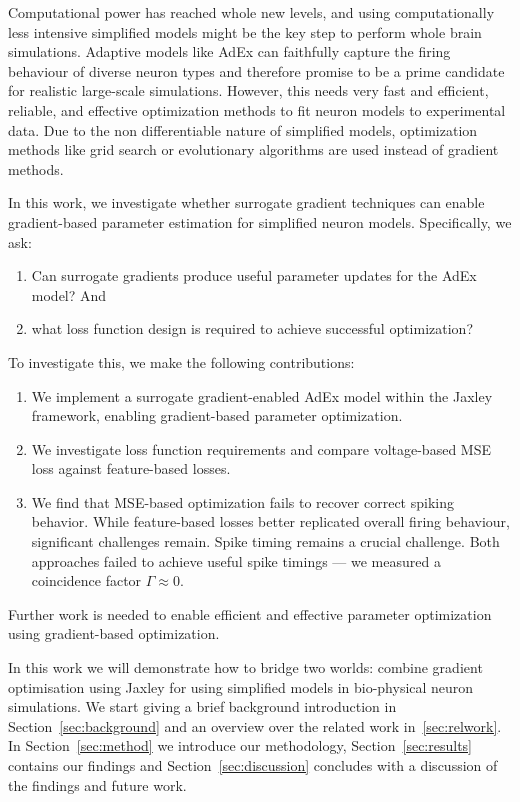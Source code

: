 \documentclass[conference]{IEEEtran}
\begin{document}
Computational power has reached whole new levels, and using computationally less intensive simplified models might be the key step to perform whole brain simulations.
Adaptive models like \ac{AdEx} can faithfully capture the firing behaviour of diverse neuron types and therefore promise to be a prime candidate for realistic large-scale simulations.
However, this needs very fast and efficient, reliable, and effective optimization methods to fit neuron models to experimental data.
Due to the non differentiable nature of simplified models, optimization methods like grid search or evolutionary algorithms are used instead of gradient methods.

In this work, we investigate whether surrogate gradient techniques can enable gradient-based parameter estimation for simplified neuron models.
Specifically, we ask:
\begin{enumerate}
  \item Can surrogate gradients produce useful parameter updates for the \ac{AdEx} model? And
  \item what loss function design is required to achieve successful optimization? 
\end{enumerate}
To investigate this, we make the following contributions:
\begin{enumerate}
  \item We implement a surrogate gradient-enabled \ac{AdEx} model within the Jaxley framework, enabling gradient-based parameter optimization.
  \item We investigate loss function requirements and compare voltage-based \ac{MSE} loss against feature-based losses.
  \item We find that \ac{MSE}-based optimization fails to recover correct spiking behavior.
    While feature-based losses better replicated overall firing behaviour, significant challenges remain.
    Spike timing remains a crucial challenge.
    Both approaches failed to achieve useful spike timings --- we measured a coincidence factor $\Gamma \approx 0$.
\end{enumerate}
Further work is needed to enable efficient and effective parameter optimization using gradient-based optimization.

In this work we will demonstrate how to bridge two worlds: combine gradient optimisation using Jaxley for using simplified models in bio-physical neuron simulations.
We start giving a brief background introduction in Section~\ref{sec:background} and an overview over the related work in~\ref{sec:relwork}.
In Section~\ref{sec:method} we introduce our methodology, Section~\ref{sec:results} contains our findings and Section~\ref{sec:discussion} concludes with a discussion of the findings and future work.
\end{document}
